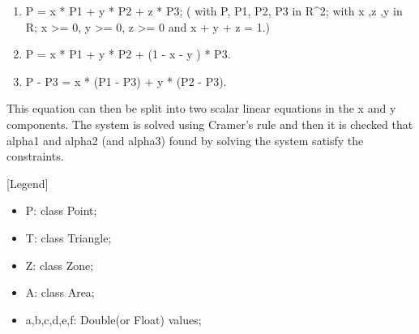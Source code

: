 \begin{enumerate}
	\item P = x * P1 + y * P2 + z * P3; ( with P, P1, P2, P3 in R^2; with x ,z ,y in R; x >= 0, y >= 0, z >= 0 and  x + y + z = 1.)
	\item P = x * P1 +  y * P2 + (1 - x - y ) * P3.
	\item P - P3 = x * (P1 - P3) + y * (P2 - P3).
\end{enumerate}

This equation can then be split into two scalar linear equations in the x and y components. The system is solved using Cramer's rule and then it is checked that alpha1 and alpha2 (and alpha3) found by solving the system satisfy the constraints.

[Legend]
\begin{itemize}
	\item P: class Point;
	\item T: class Triangle;
	\item Z:  class Zone;
	\item A: class Area;
	\item a,b,c,d,e,f: Double(or Float) values;
\end{itemize}

